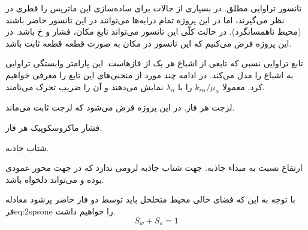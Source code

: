 \begin{tight_itemize}
\item[$\textbf{K}$] 
تانسور تراوایی مطلق. در بسیاری از حالات برای ساده‌سازی این ماتریس را قطری در نظر می‌گیرند، اما در این پروژه تمام درایه‌ها می‌توانند در این تانسور حاضر باشند (محیط ناهمسانگرد). در حالت کلّی این تانسور می‌تواند تابع مکان، فشار و ‌خ{} باشد. در این پروژه فرض می‌کنیم که این تانسور در مکان به صورت قطعه قطعه ثابت باشد.   
\item[$k_r$] 
تابع تراوایی نسبی که تابعی از اشباع هر یک از فازهاست. این پارامتر وابستگی تراوایی به اشباع را مدل می‌کند. در ادامه چند مورد از منحنی‌های این تابع را معرفی خواهیم کرد. معمولا
$k_{r\alpha}/\mu_\alpha$ 
را با $\lambda_\alpha$ نمایش می‌دهند و آن را ضریب تحرک می‌نامند.
\item[$\mu$]
لزجت هر فاز. در این پروژه فرض می‌شود که لزجت ثابت می‌ماند. 
\item[$p$] 
فشار ماکروسکوپیک هر فاز. 
\item[$g$] 
شتاب جاذبه. 
\item[$h$]
ارتفاع نسبت به مبداء جاذبه. جهت شتاب جاذبه لزومی ندارد که در جهت محور عمودی بوده و می‌تواند دلخواه باشد. 
\end{tight_itemize}


با توجه به این‌ که فضای خالی محیط متخلخل باید توسط دو فاز حاضر پر‌شود معادله ‌فر{eq:2spsone} را خواهیم داشت.
\begin{equation}
\label{eq:2spsone}
S_w+S_o=1
\end{equation}

